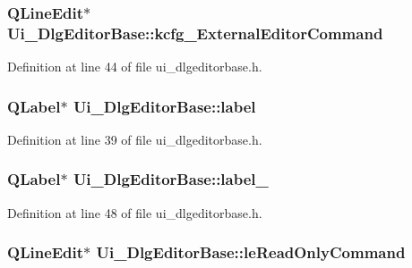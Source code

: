 \hypertarget{classUi__DlgEditorBase_a6123d3afc7b3db52828306e0c4de3e2d}{
\subsubsection[{kcfg\+\_\+\+External\+Editor\+Command}]{\setlength{\rightskip}{0pt plus 5cm}Q\+Line\+Edit$\ast$ Ui\+\_\+\+Dlg\+Editor\+Base\+::kcfg\+\_\+\+External\+Editor\+Command}}\label{classUi__DlgEditorBase_a6123d3afc7b3db52828306e0c4de3e2d}


Definition at line 44 of file ui\+\_\+dlgeditorbase.\+h.

\hypertarget{classUi__DlgEditorBase_a678b5c63f8a18e14b1c4ddb8cc24ff73}{
\subsubsection[{label}]{\setlength{\rightskip}{0pt plus 5cm}Q\+Label$\ast$ Ui\+\_\+\+Dlg\+Editor\+Base\+::label}}\label{classUi__DlgEditorBase_a678b5c63f8a18e14b1c4ddb8cc24ff73}


Definition at line 39 of file ui\+\_\+dlgeditorbase.\+h.

\hypertarget{classUi__DlgEditorBase_a814dc80e48575b71fb8f04b4cb05c199}{
\subsubsection[{label\+\_\+2}]{\setlength{\rightskip}{0pt plus 5cm}Q\+Label$\ast$ Ui\+\_\+\+Dlg\+Editor\+Base\+::label\+\_}}\label{classUi__DlgEditorBase_a814dc80e48575b71fb8f04b4cb05c199}


Definition at line 48 of file ui\+\_\+dlgeditorbase.\+h.

\hypertarget{classUi__DlgEditorBase_a2ad0da3e2f36dbf17c67fb029a0e0f75}{
\subsubsection[{le\+Read\+Only\+Command}]{\setlength{\rightskip}{0pt plus 5cm}Q\+Line\+Edit$\ast$ Ui\+\_\+\+Dlg\+Editor\+Base\+::le\+Read\+Only\+Command}}\label{classUi__DlgEditorBase_a2ad0da3e2f36dbf17c67fb029a0e0f75}


